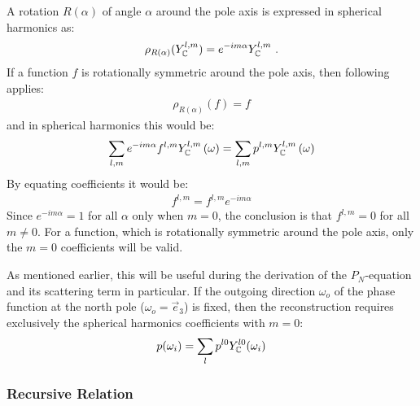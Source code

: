 A rotation $R(\alpha)$ of angle $\alpha$ around the pole axis is expressed in spherical harmonics as:
\begin{align*}
\rho_{R(\alpha)}(Y_{\mathbb{C}}^{l,m}) = e^{-i m\alpha}Y_{\mathbb{C}}^{l,m}
\ .
\end{align*}
If a function $f$ is rotationally symmetric around the pole axis, then following applies:
\begin{align*}
\rho_{R(\alpha)}(f) = f
\end{align*}
and in spherical harmonics this would be:
\begin{align*}
\sum_{l,m}
{
e^{-i m\alpha}
f^{l,m}
Y_{\mathbb{C}}^{l,m} }\left(\omega\right)
=
\sum_{l,m}
{
p^{l,m}
Y_{\mathbb{C}}^{l,m}\left(\omega\right)
}
\end{align*}
By equating coefficients it would be:
\begin{align*}
f^{l,m} = f^{l,m}e^{-i m\alpha}
\end{align*}
Since $e^{-i m\alpha}=1$ for all $\alpha$ only when $m=0$, the conclusion is that $f^{l,m} = 0$ for all $m\ne0$. For a function, which is rotationally symmetric around the pole axis, only the $m=0$ coefficients will be valid.

As mentioned earlier, this will be useful during the derivation of the $P_N$-equation and its scattering term in particular. If the outgoing direction $\omega_o$ of the phase function at the north pole ($\omega_o=\vec{e}_3$) is fixed, then the reconstruction requires exclusively the spherical harmonics coefficients with $m=0$:
\begin{align}
\label{eq:sh_exp_phase}
p(\omega_i) =
\sum_l
{
p^{l0}
Y_{\mathbb{C}}^{l0}(\omega_i)
}
\end{align}

\subsubsection*{Recursive Relation}

